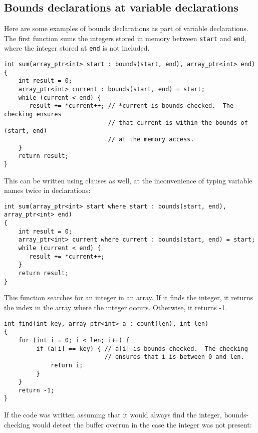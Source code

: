 \subsection{Bounds declarations at variable declarations}
\label{section:variable-declarations}

Here are some examples of bounds declarations as part of variable
declarations. The first function sums the integers stored in memory
between \texttt{start} and \texttt{end}, where the integer stored at
\texttt{end} is not included.

\begin{verbatim}
int sum(array_ptr<int> start : bounds(start, end), array_ptr<int> end)
{ 
    int result = 0;
    array_ptr<int> current : bounds(start, end) = start;
    while (current < end) {
       result += *current++; // *current is bounds-checked.  The checking ensures 
                             // that current is within the bounds of (start, end) 
                             // at the memory access.                           
    }
    return result;
}
\end{verbatim}

This can be written using  clauses as well, at the
inconvenience of typing variable names twice in declarations:

\begin{verbatim}
int sum(array_ptr<int> start where start : bounds(start, end), array_ptr<int> end)
{ 
    int result = 0;
    array_ptr<int> current where current : bounds(start, end) = start;
    while (current < end) {
       result += *current++;                          
    }
    return result;
}
\end{verbatim}

This function searches for an integer in an array. If it finds the
integer, it returns the index in the array where the integer occurs.
Otherwise, it returns -1.

\begin{verbatim}
int find(int key, array_ptr<int> a : count(len), int len)
{
    for (int i = 0; i < len; i++) {
         if (a[i] == key) { // a[i] is bounds checked.  The checking
                            // ensures that i is between 0 and len.
             return i;
         }
    }
    return -1;
}
\end{verbatim}

If the code was written assuming that it would always find the integer,
bounds-checking would detect the buffer overrun in the case the integer
was not present:

